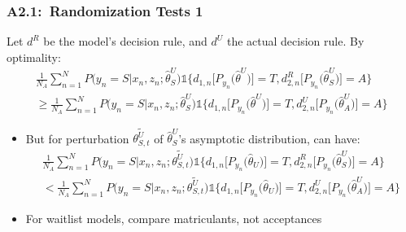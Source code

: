 \documentclass[12pt, aspectratio=169]{beamer}
\begin{document}
\begin{frame}[label=rt1]
\frametitle{A2.1:\ Randomization Tests 1}
\vspace{-2.5pt}
\begin{theorem}
Let $d^R$ be the model's decision rule, and $d^U$ the actual decision rule. By optimality:
\vspace{-15pt}
\scriptsize
\begin{multline*}
\frac{1}{N_A}\sum_{n=1}^NP\Big(y_n=S\Big|x_n,z_n;\hat\theta_S^U\Big)\mathds{1}\Big\{d_{1,n}\Big[P_{y_n}\Big(\hat\theta^U\Big)\Big]=T,d_{2,n}^R\Big[P_{y_n}\Big(\hat\theta_S^U\Big)\Big]=A\Big\} \\
\geq \frac{1}{N_A}\sum_{n=1}^NP\Big(y_n=S\Big|x_n,z_n;\hat\theta_S^U\Big)\mathds{1}\Big\{d_{1,n}\Big[P_{y_n}\Big(\hat\theta^U\Big)\Big]=T,d_{2,n}^U\Big[P_{y_n}\Big(\hat\theta_A^U\Big)\Big]=A\Big\}
\end{multline*}
\end{theorem}
\normalsize
\begin{itemize}
\item But for perturbation $\widetilde{\theta_{S,t}^U}$ of $\hat\theta_S^U$'s asymptotic distribution, can have:
\vspace{-5pt}
\scriptsize
\begin{multline*}
\frac{1}{N_A}\sum_{n=1}^NP\Big(y_n=S\Big|x_n,z_n;\widetilde{\theta_{S,t}^U}\Big)\mathds{1}\Big\{d_{1,n}\Big[P_{y_n}\Big(\hat\theta_U\Big)\Big]=T,d_{2,n}^R\Big[P_{y_n}\Big(\hat\theta_S^U\Big)\Big]=A\Big\} \\
< \frac{1}{N_A}\sum_{n=1}^NP\Big(y_n=S\Big|x_n,z_n;\widetilde{\theta_{S,t}^U}\Big)\mathds{1}\Big\{d_{1,n}\Big[P_{y_n}\Big(\hat\theta_U\Big)\Big]=T,d_{2,n}^U\Big[P_{y_n}\Big(\hat\theta_A^U\Big)\Big]=A\Big\}
\end{multline*}
\normalsize
\vspace{-10pt}
\item For waitlist models, compare matriculants, not acceptances
\end{itemize}
\hyperlink{dgi}{}
\end{frame}
\end{document}
